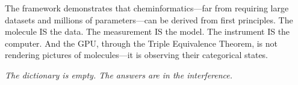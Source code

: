 \documentclass[11pt,twocolumn,a4paper]{article}
\theoremstyle{definition}
\theoremstyle{remark}
\begin{document}
The framework demonstrates that cheminformatics---far from requiring large datasets and millions of parameters---can be derived from first principles. The molecule IS the data. The measurement IS the model. The instrument IS the computer. And the GPU, through the Triple Equivalence Theorem, is not rendering pictures of molecules---it is observing their categorical states.

\medskip
\noindent\textit{The dictionary is empty. The answers are in the interference.}



\end{document}

